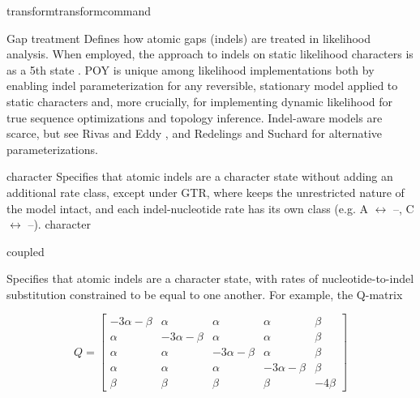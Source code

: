 \begin{command}{transform}{transformcommand}
\begin{arguments}
        \begin {argumentgroup} {Gap treatment}
            Defines how atomic gaps (indels) are treated in
            likelihood analysis. When employed, the \poy approach to
            indels on static likelihood characters is as a 5th state 
            \cite{mcguire2001models,Wheeler2006}. 
            POY is unique among likelihood implementations both
            by enabling indel parameterization for any reversible,
            stationary model applied to static characters and, more
            crucially, for implementing dynamic likelihood for true
            sequence optimizations and topology inference. Indel-aware
            models are scarce, but see Rivas and Eddy \cite{rivas2008probabilistic}, 
            and Redelings and Suchard \cite{redelings2005joint,redelings2007incorporating}
            for alternative parameterizations.

             {\obligatory character}
                {Specifies that atomic indels are a character state
                without adding an additional rate class, except
                under GTR, where \poy keeps the unrestricted nature of the
                model intact, and each indel-nucleotide rate has its
                own class (e.g. A $\leftrightarrow$ --, C $\leftrightarrow$ --).}
                {character}
                        
             {\obligatory coupled}
                {Specifies that atomic indels are a character state,
                with rates of nucleotide-to-indel substitution
                constrained to be equal to one another. For example,
                the Q-matrix

                \begin{equation*}
                    Q =
                        \begin{bmatrix}
                            -3 \alpha - \beta & \alpha & \alpha & \alpha & \beta \\
                            \alpha & -3 \alpha - \beta & \alpha & \alpha & \beta \\
                            \alpha & \alpha & -3 \alpha - \beta & \alpha & \beta \\
                            \alpha & \alpha & \alpha & -3 \alpha - \beta & \beta \\
                            \beta & \beta & \beta & \beta & -4 \beta
                    \end{bmatrix}
                \end{equation*}

}
\end{argumentgroup}
\end{arguments}
\end{command}
